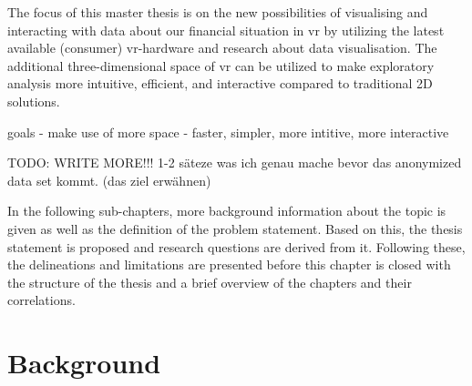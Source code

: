 The focus of this master thesis is on the new possibilities of visualising and interacting with data about our financial situation in \gls{vr} by utilizing the latest available (consumer) \gls{vr}-hardware and research about data visualisation. The additional three-dimensional space of \gls{vr} can be utilized to make exploratory analysis more intuitive, efficient, and interactive compared to traditional 2D solutions.


goals
- make use of more space
- faster, simpler, more intitive, more interactive

TODO: WRITE MORE!!!
1-2 säteze was ich genau mache bevor das anonymized data set kommt. (das ziel erwähnen)

In the following sub-chapters, more background information about the topic is given as well as the definition of the problem statement. Based on this, the thesis statement is proposed and research questions are derived from it. Following these, the delineations and limitations are presented before this chapter is closed with the structure of the thesis and a brief overview of the chapters and their correlations.



\section{Background}

